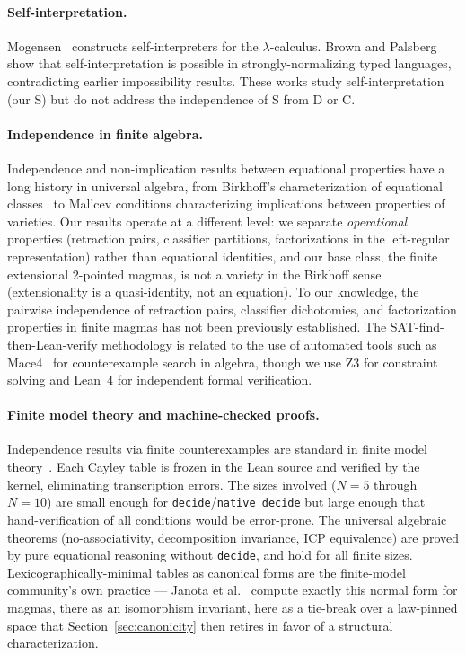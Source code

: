 \documentclass[sigconf,screen]{acmart}
\theoremstyle{remark}
\begin{document}
\paragraph{Self-interpretation.}
Mogensen~\cite{mogensen92} constructs self-interpreters for the $\lambda$-calculus. Brown and Palsberg~\cite{brown16} show that self-interpretation is possible in strongly-normalizing typed languages, contradicting earlier impossibility results. These works study self-interpretation (our S) but do not address the independence of S from D or C.

\paragraph{Independence in finite algebra.}
Independence and non-implication results between equational properties have a long history in universal algebra, from Birkhoff's characterization of equational classes~\cite{burris81} to Mal'cev conditions characterizing implications between properties of varieties. Our results operate at a different level: we separate \emph{operational} properties (retraction pairs, classifier partitions, factorizations in the left-regular representation) rather than equational identities, and our base class, the finite extensional 2-pointed magmas, is not a variety in the Birkhoff sense (extensionality is a quasi-identity, not an equation). To our knowledge, the pairwise independence of retraction pairs, classifier dichotomies, and factorization properties in finite magmas has not been previously established. The SAT-find-then-Lean-verify methodology is related to the use of automated tools such as Mace4~\cite{mccune10} for counterexample search in algebra, though we use Z3 for constraint solving and Lean~4 for independent formal verification.

\paragraph{Finite model theory and machine-checked proofs.}
Independence results via finite counterexamples are standard in finite model theory~\cite{libkin04}. Each Cayley table is frozen in the Lean source and verified by the kernel, eliminating transcription errors. The sizes involved ($N\!=\!5$ through $N\!=\!10$) are small enough for \texttt{decide}/\texttt{native\_decide} but large enough that hand-verification of all conditions would be error-prone. The universal algebraic theorems (no-associativity, decomposition invariance, ICP equivalence) are proved by pure equational reasoning without \texttt{decide}, and hold for all finite sizes. Lexicographically-minimal tables as canonical forms are the finite-model community's own practice --- Janota et al.~\cite{janota24} compute exactly this normal form for magmas, there as an isomorphism invariant, here as a tie-break over a law-pinned space that Section~\ref{sec:canonicity} then retires in favor of a structural characterization.
\end{document}
